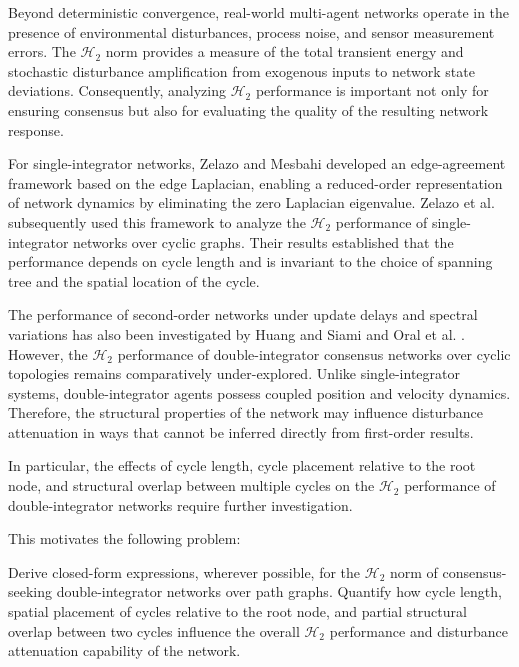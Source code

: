 Beyond deterministic convergence, real-world multi-agent networks operate in the presence of environmental disturbances, process noise, and sensor measurement errors. The $\mathcal{H}_2$ norm provides a measure of the total transient energy and stochastic disturbance amplification from exogenous inputs to network state deviations. Consequently, analyzing $\mathcal{H}_2$ performance is important not only for ensuring consensus but also for evaluating the quality of the resulting network response.

For single-integrator networks, Zelazo and Mesbahi \cite{zelazo2010edge} developed an edge-agreement framework based on the edge Laplacian, enabling a reduced-order representation of network dynamics by eliminating the zero Laplacian eigenvalue. Zelazo et al. \cite{zelazo2013performance} subsequently used this framework to analyze the $\mathcal{H}_2$ performance of single-integrator networks over cyclic graphs. Their results established that the performance depends on cycle length and is invariant to the choice of spanning tree and the spatial location of the cycle.

The performance of second-order networks under update delays and spectral variations has also been investigated by Huang and Siami \cite{huang2022role} and Oral et al. \cite{oral2017performance}. However, the $\mathcal{H}_2$ performance of double-integrator consensus networks over cyclic topologies remains comparatively under-explored. Unlike single-integrator systems, double-integrator agents possess coupled position and velocity dynamics. Therefore, the structural properties of the network may influence disturbance attenuation in ways that cannot be inferred directly from first-order results.

In particular, the effects of cycle length, cycle placement relative to the root node, and structural overlap between multiple cycles on the $\mathcal{H}_2$ performance of double-integrator networks require further investigation.

This motivates the following problem:
\begin{problem}
Derive closed-form expressions, wherever possible, for the $\mathcal{H}_2$ norm of consensus-seeking double-integrator networks over path graphs. Quantify how cycle length, spatial placement of cycles relative to the root node, and partial structural overlap between two cycles influence the overall $\mathcal{H}_2$ performance and disturbance attenuation capability of the network.
\end{problem}

